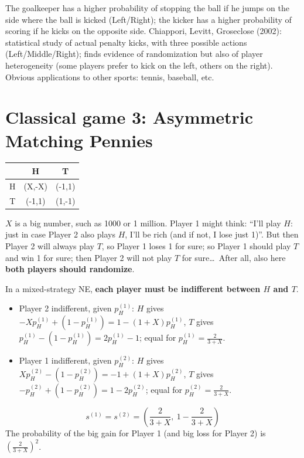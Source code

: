 \documentclass[11pt,a4paper,openany]{book}
\begin{document}
\begin{exbox}[title=Real life: penalty kicks]
The goalkeeper has a higher probability of stopping the ball if he jumps on the side where
the ball is kicked (Left/Right); the kicker has a higher probability of scoring if he kicks
on the opposite side. Chiappori, Levitt, Groseclose (2002): statistical study of actual
penalty kicks, with three possible actions (Left/Middle/Right); finds evidence of
randomization but also of player heterogeneity (some players prefer to kick on the left,
others on the right). Obvious applications to other sports: tennis, baseball, etc.
\end{exbox}


\section{Classical game 3: Asymmetric Matching Pennies}

\begin{exbox}[title=Asymmetric Matching Pennies]
\begin{center}
\begin{tabular}{c|cc}
 & H & T \\ \hline
H & (X,-X) & (-1,1) \\
T & (-1,1) & (1,-1)
\end{tabular}
\end{center}
$X$ is a big number, such as 1000 or 1 million. Player 1 might think: ``I'll play $H$:
just in case Player 2 also plays $H$, I'll be rich (and if not, I lose just 1)''. But then
Player 2 will always play $T$, so Player 1 loses 1 for sure; so Player 1 should play $T$ and
win 1 for sure; then Player 2 will not play $T$ for sure\dots\ After all, also here
\textbf{both players should randomize}.
\end{exbox}

\begin{propbox}[title=Mixed-strategy NE]
In a mixed-strategy NE, \textbf{each player must be indifferent between $H$ and $T$}.
\begin{itemize}
  \item Player 2 indifferent, given $p_H^{(1)}$: $H$ gives
        $-Xp_H^{(1)} + (1 - p_H^{(1)}) = 1 - (1+X)p_H^{(1)}$, $T$ gives
        $p_H^{(1)} - (1 - p_H^{(1)}) = 2p_H^{(1)} - 1$; equal for
        $p_H^{(1)} = \frac{2}{3+X}$.
  \item Player 1 indifferent, given $p_H^{(2)}$: $H$ gives
        $Xp_H^{(2)} - (1 - p_H^{(2)}) = -1 + (1+X)p_H^{(2)}$, $T$ gives
        $-p_H^{(2)} + (1 - p_H^{(2)}) = 1 - 2p_H^{(2)}$; equal for
        $p_H^{(2)} = \frac{2}{3+X}$.
\end{itemize}
\[
s^{(1)} = s^{(2)} = \left(\frac{2}{3+X},\ 1 - \frac{2}{3+X}\right)
\]
The probability of the big gain for Player 1 (and big loss for Player 2) is
$\left(\frac{2}{3+X}\right)^2$.
\end{propbox}
\end{document}

